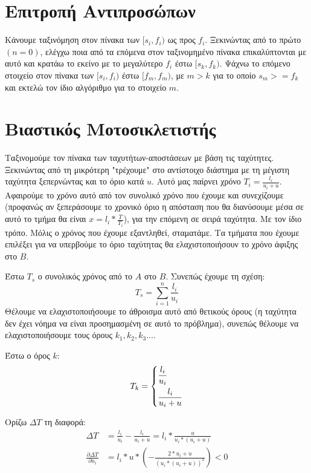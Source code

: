 \documentclass[a4paper,10pt]{article} \usepackage{anysize}
\begin{document}
\def\thesubsection {\alph{subsection}}
\renewcommand{\labelenumi}{\roman{enumi})}
\renewcommand{\labelenumii}{(\arabic{enumii})}



\section{Επιτροπή Αντιπροσώπων} \setcounter{section}{1}
Κάνουμε ταξινόμηση στον πίνακα των $[s_i,f_i)$ ως προς $f_i$. Ξεκινώντας από
το πρώτο $(n=0)$, ελέγχω ποια από τα επόμενα στον ταξινομημένο πίνακα επικαλύπτονται
με αυτό και κρατάω το εκείνο με το μεγαλύτερο $f_i$ έστω $[s_k,f_k)$. Ψάχνω το
επόμενο στοιχείο στον πίνακα των $[s_i,f_i)$ έστω $[f_m,f_m)$, με $m>k$ για το οποίο
$s_m>=f_k$ και εκτελώ τον ίδιο αλγόριθμο για το στοιχείο $m$.%

\section{Βιαστικός Μοτοσικλετιστής}
Ταξινομούμε τον πίνακα των ταχυτήτων-αποστάσεων με βάση τις ταχύτητες.
Ξεκινώντας από τη μικρότερη "τρέχουμε" στο αντίστοιχο διάστημα με τη μέγιστη
ταχύτητα ξεπερνώντας και το όριο κατά $u$. Αυτό μας παίρνει χρόνο
$T_i=\frac{l_i}{u_i+u}$. Αφαιρούμε το χρόνο αυτό από τον συνολικό χρόνο που
έχουμε και συνεχίζουμε (προφανώς αν ξεπεράσουμε το χρονικό όριο η απόσταση που
θα διανύσουμε μέσα σε αυτό το τμήμα θα είναι $x=l_i*\frac{T}{T_i}$), για την
επόμενη σε σειρά ταχύτητα. Με τον ίδιο τρόπο. Μόλις ο χρόνος που έχουμε
εξαντληθεί, σταματάμε. Τα τμήματα που έχουμε επιλέξει για να υπερβούμε το όριο
ταχύτητας θα ελαχιστοποιήσουν το χρόνο άφιξης στο $B$.

Έστω $T_s$ ο συνολικός χρόνος από το $A$ στο $B$. Συνεπώς έχουμε τη σχέση:
\[
T_s=\sum_{i=1}^n{\frac{l_i}{u_i}}
\]
Θέλουμε να ελαχιστοποιήσουμε το άθροισμα αυτό από θετικούς όρους (η ταχύτητα
δεν έχει νόημα να είναι προσημασμένη σε αυτό το πρόβλημα), συνεπώς θέλουμε να
ελαχιστοποιήσουμε τους όρους $k_1, k_2, k_3 ...$.

Έστω ο όρος $k$:
\[
T_k=
	\begin{dcases}
	\frac{l_i}{u_i} \\
	\frac{l_i}{u_i+u}  
	\end{dcases}
\]

Ορίζω $\Delta{T}$ τη διαφορά:
\begin{align*}
	\Delta{T}&=\frac{l_i}{u_i} - \frac{l_i}{u_i+u} =
	l_i*\frac{u}{u_i*(u_i+u)}\\
	\frac{\partial{\Delta{T} }}{\partial{u_i}} &=
	l_i*u*(-\frac{2*u_i+u}{(u_i*(u_i+u))^2}) < 0
\end{align*}
\end{document}
